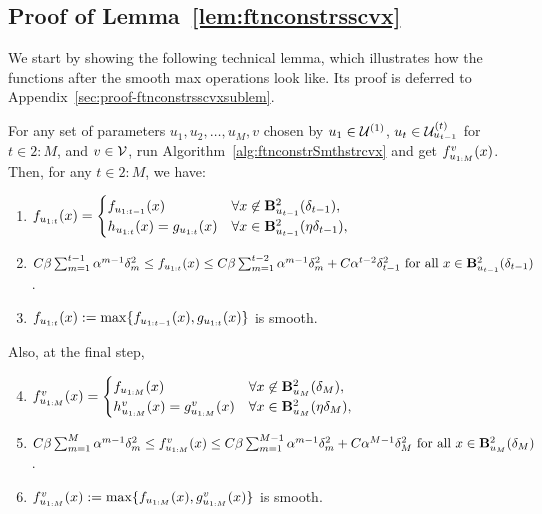 \subsection{Proof of Lemma~\ref{lem:ftnconstrsscvx}} 
\label{sec:proof-ftnconstrsscvx}
We start by showing the following technical lemma, 
which illustrates how the functions after the smooth max operations look like.
Its proof is deferred to Appendix~\ref{sec:proof-ftnconstrsscvxsublem}.
\begin{lemma}
	\label{sublem:ftnconstrsscvx}
	For any set of parameters $u_1, u_2, \dots, u_M, v$ chosen by
	$u_1 \in \Uone$, $u_t \in \Utemp{t-1}{t}$ for $t \in 2:M$, and $v \in \V$,
	run Algorithm~\ref{alg:ftnconstrSmthstrcvx} and get $\ftnuv(x)$.
	Then, for any $t \in 2:M$, we have: 
	\begin{enumerate}
		\item \label{itemsub:ftnconstrsscvx-1} 
		$\ftnut(x) = \begin{cases}
		\ftnutmone(x) &\forall x \not\in \Btwotmone, \\
		\ftninut(x) = \gut(x) &\forall x\in \Btwotmoneh,
		\end{cases}$
		\item \label{itemsub:ftnconstrsscvx-3} 
		$C \beta \sum_{m=1}^{t-1} \alpha^{m-1}\delta_m^2 
		\leq
		\ftnut (x)
		\leq
		C \beta \sum_{m=1}^{t-2} \alpha^{m-1}\delta_m^2 + C \alpha^{t-2} \delta_{t-1}^2
		\text{ for all } x \in \Btwotmone$.
		\item \label{itemsub:ftnconstrsscvx-4}
		$\ftnut(x)\defeq \max \{ \ftnutmone (x), \gut(x) \}$ is smooth.
	\end{enumerate}
	Also, at the final step,
	\begin{enumerate}
		\setcounter{enumi}{3}
		\item \label{itemsub:ftnconstrsscvx-5} 
		$\ftnuv(x) = \begin{cases}
		\ftnuM(x) &\forall x \not\in \BtwoM, \\
		\ftninuv(x) = \guv (x) &\forall x\in \BtwoMh,
		\end{cases}$
		\item \label{itemsub:ftnconstrsscvx-7}
		$C \beta \sum_{m=1}^{M} \alpha^{m-1}\delta_m^2
		\leq
		\ftnuv (x)
		\leq
		C \beta \sum_{m=1}^{M-1} \alpha^{m-1}\delta_m^2 + C \alpha^{M-1} \delta_{M}^2
		\text{ for all } x \in \BtwoM$.
		\item \label{itemsub:ftnconstrsscvx-8}
		$\ftnuv(x) \defeq \max \{ \ftnuM(x), \guv(x) \}$ is smooth.
	\end{enumerate}
\end{lemma}

